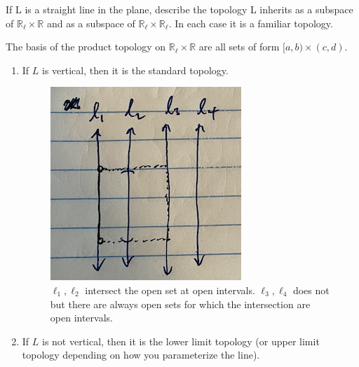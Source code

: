   \begin{exercise}[Munkres 16.8]
    If L is a straight line in the plane, describe the topology L inherits as a subspace of $\mathbb{R}_\ell \times \mathbb{R}$ and as a subspace of $\mathbb{R}_\ell \times \mathbb{R}_\ell$. In each case it is a familiar topology.
  \end{exercise}
  \begin{solution}[Munkres 16.8]  
    The basis of the product topology on $\mathbb{R}_\ell \times \mathbb{R}$ are all sets of form $[a, b) \times (c, d)$. 
    \begin{enumerate}
      \item If $L$ is vertical, then it is the standard topology. 
      \begin{figure}[H]
        \centering 
        \includegraphics[scale=0.4]{img/1.png}
        \caption{$\ell_1, \ell_2$ intersect the open set at open intervals. $\ell_3, \ell_4$ does not but there are always open sets for which the intersection are open intervals. } 
        \label{fig:1}
      \end{figure}

      \item If $L$ is not vertical, then it is the lower limit topology (or upper limit topology depending on how you parameterize the line). 


\end{enumerate}
\end{solution}
